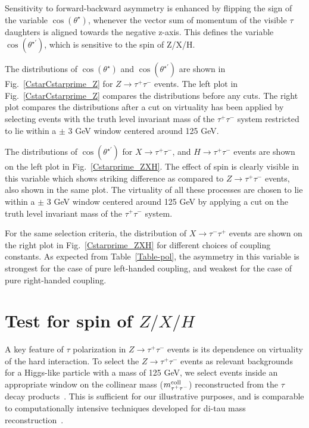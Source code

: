 \documentclass[12pt]{article}
\begin{document}
Sensitivity to forward-backward asymmetry is enhanced by flipping the sign of the variable $\cos(\theta^\star)$,
whenever the vector sum of momentum of the visible $\tau$ daughters is aligned towards the negative z-axis.
This defines the variable $\cos(\theta^{\star\prime})$, which is sensitive to the spin of Z/X/H.

The distributions of $\cos(\theta^\star)$ and $\cos(\theta^{\star\prime})$ are shown in Fig.~\ref{CstarCstarprime_Z} for $Z\to\tau^+\tau^-$ events.
The left plot in Fig.~\ref{CstarCstarprime_Z} compares the distributions before any cuts.
The right plot compares the distributions after a cut on virtuality has been applied 
by selecting events with the truth level invariant mass of the $\tau^+\tau^-$ system restricted to lie within a $\pm$ 3 GeV window centered around 125 GeV.

The distributions of $\cos(\theta^{\star\prime})$ for $X\to\tau^+\tau^-$, and $H\to\tau^+\tau^-$ events are shown on the left plot in Fig.~\ref{Cstarprime_ZXH}.
The effect of spin is clearly visible in this variable which shows striking difference as compared to $Z\to\tau^+\tau^-$ events, also shown in the same plot.
The virtuality of all these processes are chosen to lie within a $\pm$ 3 GeV window centered around 125 GeV 
by applying a cut on the truth level invariant mass of the $\tau^+\tau^-$ system.

For the same selection criteria, the distribution of $X\to\tau^-\tau^+$ events are shown 
on the right plot in Fig.~\ref{Cstarprime_ZXH} for different choices of coupling constants.
As expected from Table~\ref{Table-pol}, the asymmetry in this variable is strongest for the case of pure left-handed coupling,
and weakest for the case of pure right-handed coupling. 

\section{Test for spin of $Z/X/H$}

A key feature of  $\tau$ polarization in $Z\to\tau^+\tau^-$ events is its dependence on virtuality of the hard interaction.
To select the $Z\to\tau^+\tau^-$ events as relevant backgrounds for a Higgs-like particle with a mass of 125 GeV,
we select events inside an appropriate window on the collinear mass ($m^{\rm{coll}}_{\tau^+\tau^-}$) reconstructed from the $\tau$ decay products~\cite{Ellis:1987xu}.
This is sufficient for our illustrative purposes, and is comparable to computationally intensive techniques developed for di-tau mass reconstruction~\cite{Elagin:2010aw}.
\end{document}
